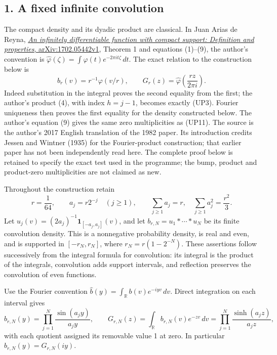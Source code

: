 \documentclass[
  10pt,
  a4paper,
]{article}
\begin{document}
\subsection{1. A fixed infinite
convolution}\label{a-fixed-infinite-convolution}

The compact density and its dyadic product are classical. In Juan Arias
de Reyna, \href{https://arxiv.org/abs/1702.05442v1}{\emph{An infinitely
differentiable function with compact support: Definition and
properties}, arXiv:1702.05442v1}, Theorem 1 and equations (1)--(9), the
author's convention is
\(\widehat\varphi(\zeta)=\int\varphi(t)e^{-2\pi i t\zeta}\,dt\). The
exact relation to the construction below is \[
b_r(v)=r^{-1}\varphi(v/r),\qquad
G_r(z)=\widehat\varphi\!\left(\frac{rz}{2\pi i}\right).
\tag{UP0}
\] Indeed substitution in the integral proves the second equality from
the first; the author's product (4), with index \(h=j-1\), becomes
exactly (UP3). Fourier uniqueness then proves the first equality for the
density constructed below. The author's equation (9) gives the same zero
multiplicities as (UP11). The source is the author's 2017 English
translation of the 1982 paper. Its introduction credits Jessen and
Wintner (1935) for the Fourier-product construction; that earlier paper
has not been independently read here. The complete proof below is
retained to specify the exact test used in the programme; the bump,
product and product-zero multiplicities are not claimed as new.

Throughout the construction retain \[
r=\frac1{64},\qquad a_j=r2^{-j}\quad(j\ge1),\qquad
\sum_{j\ge1}a_j=r,\quad \sum_{j\ge1}a_j^2=\frac{r^2}{3}.
\tag{UP1}
\] Let \(u_j(v)=(2a_j)^{-1}\mathbf1_{[-a_j,a_j]}(v)\), and let
\(b_{r,N}=u_1*\cdots*u_N\) be its finite convolution density. This is a
nonnegative probability density, is real and even, and is supported in
\([-r_N,r_N]\), where \(r_N=r(1-2^{-N})\). These assertions follow
successively from the integral formula for convolution: its integral is
the product of the integrals, convolution adds support intervals, and
reflection preserves the convolution of even functions.

Use the Fourier convention
\(\widehat b(y)=\int_{\mathbb R}b(v)e^{-iyv}\,dv\). Direct integration
on each interval gives \[
\widehat b_{r,N}(y)=\prod_{j=1}^N\frac{\sin(a_jy)}{a_jy},\qquad
G_{r,N}(z)=\int_{\mathbb R}b_{r,N}(v)e^{-zv}\,dv
=\prod_{j=1}^N\frac{\sinh(a_jz)}{a_jz},
\tag{UP2}
\] with each quotient assigned its removable value 1 at zero. In
particular \(\widehat b_{r,N}(y)=G_{r,N}(iy)\).
\end{document}
